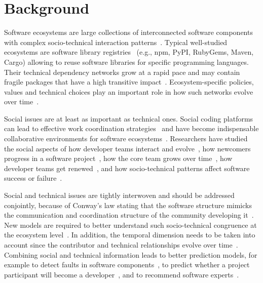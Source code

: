 

\section{Background}

Software ecosystems are large collections of interconnected software components with complex socio-technical interaction patterns~\cite{Lungu2009,ManikasHansen2013}. %
Typical well-studied ecosystems are software library registries~\cite{Decan2017SANER,Kikas2017,Dietrich2019} (e.g., npm, PyPI, RubyGems, Maven, Cargo) allowing to reuse software libraries for specific programming languages.
 Their technical dependency networks grow at a rapid pace and may contain fragile packages that have a high transitive impact~\cite{Decan2019EMSE}. Ecosystem-specific policies, values and technical choices play an important role in how such networks evolve over time~\cite{Bogart2016}.

Social issues are at least as important as technical ones. Social coding platforms can lead to effective work coordination strategies~\cite{DabbishSTH12} and have become indispensable collaborative environments for software ecosystems~\cite{Herbsleb1999}.
Researchers have studied the social aspects of how developer teams interact and evolve~\cite{lopezfernandez2006:sna}, how newcomers progress in a software project~\cite{Zhou2011-ICSE,Zhou2012-ICSE}, how the core team grows over time~\cite{Robles2009MSR}, how developer teams get renewed~\cite{Constantinou2017SANER}, and how socio-technical patterns affect software success or failure~\cite{SurianTLCL13}. 

Social and technical issues are tightly interwoven and should be addressed conjointly, because of Conway's law stating that the software structure mimicks the communication and coordination structure of the community developing it~\cite{Conway1968, Herbsleb1999, Kwan2011,Blincoe2019}. New models are required to better understand such socio-technical congruence at the ecosystem level~\cite{Palyart2018TSE}. In addition, the temporal dimension needs to be taken into account since the contributor and technical relationships evolve over time~\cite{Cataldo2008}.
Combining social and technical information leads to better prediction models, for example to detect faults in software components~\cite{Bird2009,Bhattacharya2012}, to predict whether a project participant will become a developer~\cite{Gharehyazie2013-ICSM}, and to recommend software experts~\cite{Kintab:2014:RSE:2735522.2735526}.

